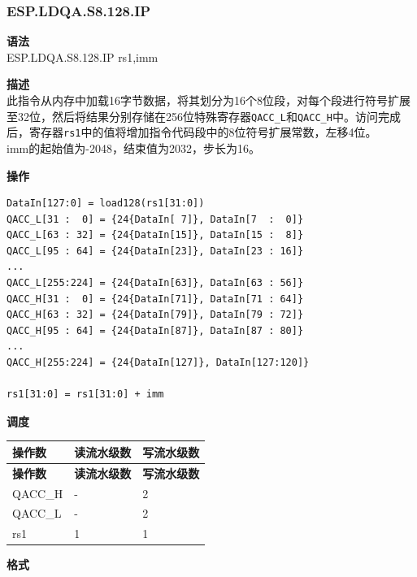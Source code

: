 \newpage
\subsubsection{ESP.LDQA.S8.128.IP}\label{instruction:ESPLDQAS8128IP}
\textbf{语法}\\
ESP.LDQA.S8.128.IP rs1,imm

\textbf{描述}\\
此指令从内存中加载16字节数据，将其划分为16个8位段，对每个段进行符号扩展至32位，然后将结果分别存储在256位特殊寄存器\lstinline{QACC_L}和\lstinline{QACC_H}中。访问完成后，寄存器\lstinline{rs1}中的值将增加指令代码段中的8位符号扩展常数，左移4位。\\

imm的起始值为-2048，结束值为2032，步长为16。

\textbf{操作}
\begin{lstlisting}
DataIn[127:0] = load128(rs1[31:0])
QACC_L[31 :  0] = {24{DataIn[ 7]}, DataIn[7  :  0]}
QACC_L[63 : 32] = {24{DataIn[15]}, DataIn[15 :  8]}
QACC_L[95 : 64] = {24{DataIn[23]}, DataIn[23 : 16]}
...
QACC_L[255:224] = {24{DataIn[63]}, DataIn[63 : 56]}
QACC_H[31 :  0] = {24{DataIn[71]}, DataIn[71 : 64]}
QACC_H[63 : 32] = {24{DataIn[79]}, DataIn[79 : 72]}
QACC_H[95 : 64] = {24{DataIn[87]}, DataIn[87 : 80]}
...
QACC_H[255:224] = {24{DataIn[127]}, DataIn[127:120]}

rs1[31:0] = rs1[31:0] + imm
\end{lstlisting}

\textbf{调度}\\
\begin{longtable}[c]{|l|l|l|}
    \hline
    \rowcolor{lightgray}
    \textbf{操作数} & \textbf{读流水级数} & \textbf{写流水级数} \\\hline
    \endfirsthead
    \hline
    \rowcolor{lightgray}
     \textbf{操作数} & \textbf{读流水级数} & \textbf{写流水级数} \\\hline
    \endhead
    \hline
    \endfoot

  QACC\_H & - & 2 \\\hline
    QACC\_L & - & 2 \\\hline
  rs1 & 1 & 1

\end{longtable}

\textbf{格式}\\

